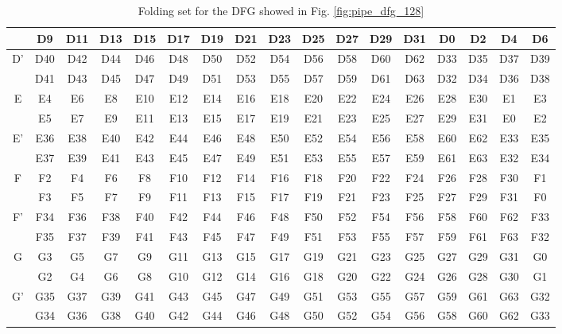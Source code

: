 \documentclass[a4paper, 10pt, conference]{ieeeconf}
\begin{document}
\begin{table}
\begin{threeparttable}
\begin{tabular}{|c||cccccccccccccccc|}
   & D9 & D11 & D13 & D15 & D17 & D19 & D21 & D23 & D25 & D27 & D29 & D31 & D0 & D2 & D4 & D6 \\  
\hline
  \multirow{2}{*}{D'} & D40 & D42 & D44 & D46 & D48 & D50 & D52 & D54 & D56 & D58 & D60 & D62 & D33 & D35 & D37 & D39 \\  

   & D41 & D43 & D45 & D47 & D49 & D51 & D53 & D55 & D57 & D59 & D61 & D63 & D32 & D34 & D36 & D38 \\  
\hline
  \multirow{2}{*}{E} & E4 & E6 & E8 & E10 & E12 & E14 & E16 & E18 & E20 & E22 & E24 & E26 & E28 & E30 & E1 & E3 \\  

   & E5 & E7 & E9 & E11 & E13 & E15 & E17 & E19 & E21 & E23 & E25 & E27 & E29 & E31 & E0 & E2 \\  
\hline
  \multirow{2}{*}{E'} & E36 & E38 & E40 & E42 & E44 & E46 & E48 & E50 & E52 & E54 & E56 & E58 & E60 & E62 & E33 & E35 \\  

   & E37 & E39 & E41 & E43 & E45 & E47 & E49 & E51 & E53 & E55 & E57 & E59 & E61 & E63 & E32 & E34 \\  
\hline
  \multirow{2}{*}{F} & F2 & F4 & F6 & F8 & F10 & F12 & F14 & F16 & F18 & F20 & F22 & F24 & F26 & F28 & F30 & F1 \\  

   & F3 & F5 & F7 & F9 & F11 & F13 & F15 & F17 & F19 & F21 & F23 & F25 & F27 & F29 & F31 & F0 \\  
\hline
  \multirow{2}{*}{F'} & F34 & F36 & F38 & F40 & F42 & F44 & F46 & F48 & F50 & F52 & F54 & F56 & F58 & F60 & F62 & F33 \\  

   & F35 & F37 & F39 & F41 & F43 & F45 & F47 & F49 & F51 & F53 & F55 & F57 & F59 & F61 & F63 & F32 \\  
\hline
  \multirow{2}{*}{G} & G3 & G5 & G7 & G9 & G11 & G13 & G15 & G17 & G19 & G21 & G23 & G25 & G27 & G29 & G31 & G0 \\  

   & G2 & G4 & G6 & G8 & G10 & G12 & G14 & G16 & G18 & G20 & G22 & G24 & G26 & G28 & G30 & G1 \\  
\hline
  \multirow{2}{*}{G'} & G35 & G37 & G39 & G41 & G43 & G45 & G47 & G49 & G51 & G53 & G55 & G57 & G59 & G61 & G63 & G32 \\  

   & G34 & G36 & G38 & G40 & G42 & G44 & G46 & G48 & G50 & G52 & G54 & G56 & G58 & G60 & G62 & G33 \\
\hline
\end{tabular}
\end{threeparttable}
\caption{Folding set for the DFG showed in Fig. \ref{fig:pipe_dfg_128}}
\label{tab:fold_set_128}
\end{table}
\end{document}

